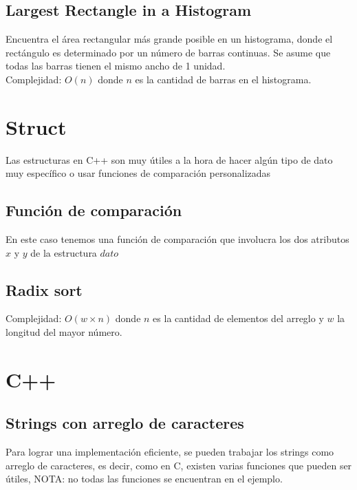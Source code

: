 \documentclass[10pt,letterpaper,twocolumn]{article}
\newcommand{\source}[1]{
	
	\dotfill
}
\begin{document}
	\subsection{Largest Rectangle in a Histogram}
		Encuentra el área rectangular más grande posible en un histograma, donde el rectángulo es determinado por un número de barras continuas. Se asume que todas las barras tienen el mismo ancho de 1 unidad. \\
		Complejidad: $O(n)$ donde $n$ es la cantidad de barras en el histograma.
		\source{./src/largest_rectangle.cpp}
		
	

\section{Struct}
	Las estructuras en C++ son muy útiles a la hora de hacer algún tipo de dato muy específico o usar funciones de comparación personalizadas
	\subsection{Función de comparación}
	En este caso tenemos una función de comparación que involucra los dos atributos $x$ y $y$ de la estructura $dato$
	\source{./src/struct.cpp}
	\subsection{Radix sort}
	Complejidad: $O(w \times n)$ donde $n$ es la cantidad de elementos del arreglo y $w$ la longitud del mayor número.\\
	\source{./src/radixSort.cpp}

\section{C++}
	\subsection{Strings con arreglo de caracteres}
	Para lograr una implementación eficiente, se pueden trabajar los strings como arreglo de caracteres, es decir, como en C, existen varias funciones que pueden ser útiles, NOTA: no todas las funciones se encuentran en el ejemplo.
	\source{./src/getsScanfGetline.cpp}
	
\end{document}
